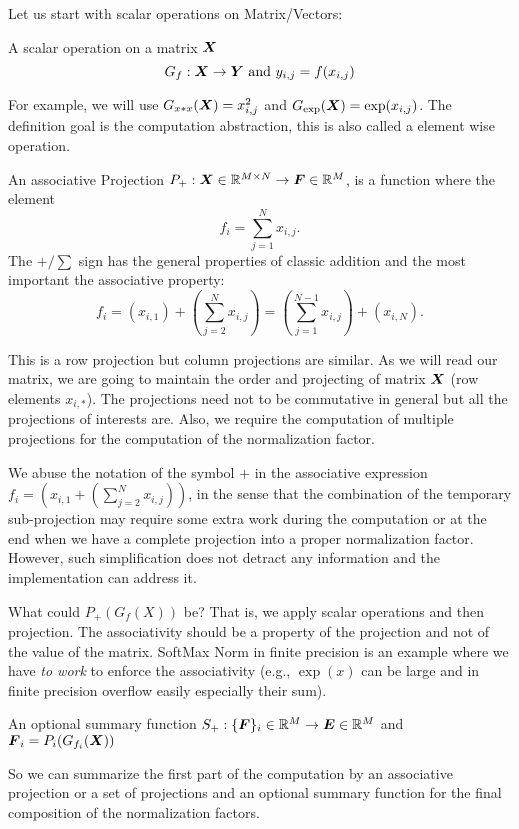 \documentclass[acmsmall]{acmart}
\begin{document}
Let us start with scalar operations on Matrix/Vectors:
\begin{definition}
  A scalar operation on a matrix ${\boldsymbol X}$
  \begin{equation}
    G_f: {\boldsymbol X} \rightarrow {\boldsymbol Y} \text{ and }  y_{i,j} = f(x_{i,j})
  \end{equation}
\end{definition}

For example, we will use $G_{x*x}({\boldsymbol X}) = x_{i,j}^2$ and
$G_{\exp}({\boldsymbol X}) = \exp(x_{i,j})$. The definition goal is the
computation abstraction, this is also called a element wise operation.


\begin{definition}
An associative Projection $P_+: {\boldsymbol X}\in\mathbb{R}^{M\times N} \rightarrow
{\boldsymbol F} \in \mathbb{R}^{M}$, is a function where the element
\[ f_i = \sum_{j=1}^N x_{i,j}. \]
The $+/\sum$ sign has the general properties of classic addition and
the most important the associative property:
\[
f_i = (x_{i,1}) + (\sum_{j=2}^N x_{i,j}) = (\sum_{j=1}^{N-1} x_{i,j}) + (x_{i,N}).
\]
\end{definition}

This is a row projection but column projections are similar.  As we
will read our matrix, we are going to maintain the order and
projecting of matrix ${\boldsymbol X}$ (row elements $x_{i,*}$). The
projections need not to be commutative in general but all the
projections of interests are. Also, we require the computation of
multiple projections for the computation of the normalization factor.

We abuse the notation of the symbol $+$ in the associative expression
$f_i = (x_{i,1} + (\sum_{j=2}^N x_{i,j}))$, in the sense that the
combination of the temporary sub-projection may require some extra
work during the computation or at the end when we have a complete
projection into a proper normalization factor. However, such
simplification does not detract any information and the implementation
can address it.

What could $P_+(G_f(X))$ be? That is, we apply scalar operations and
then projection. The associativity should be a property of the
projection and not of the value of the matrix. SoftMax Norm in finite
precision is an example where we have {\em to work} to enforce the
associativity (e.g., $\exp(x)$ can be large and in finite precision
overflow easily especially their sum).

\begin{definition}
  An optional summary function $S_+: \{{\boldsymbol F}\}_i\in\mathbb{R}^{ M}
  \rightarrow {\boldsymbol E} \in \mathbb{R}^{M}$ and  ${\boldsymbol F}_i = P_i(G_{f_i}({\boldsymbol X}))$
\end{definition}
So we can summarize the first part of the computation by an
associative projection or a set of projections and an optional summary
function for the final composition of the normalization factors.
\end{document}
